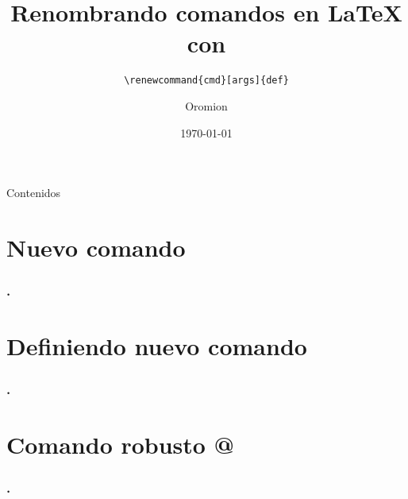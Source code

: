 \documentclass[12pt]{beamer}
\begin{document}
	\author{Oromion}
	\title{Renombrando comandos en \LaTeX{} con}
	\cprotect\subtitle{\verb|\renewcommand{cmd}[args]{def}|}
	\logo{\LaTeX{}}
	\date{\today}
	\subject{Fin del curso}
	\begin{frame}[plain]
	\maketitle
\end{frame}


\begin{frame}{Contenidos}{}
\tableofcontents
\end{frame}
\section{Nuevo comando}
\begin{frame}
\frametitle{\thesection.}

\end{frame}
\section{Definiendo nuevo comando}


\begin{frame}
\frametitle{\thesection.}
\end{frame}
\section{Comando robusto @}

\begin{frame}
\frametitle{\thesection.}

\end{frame}
\end{document}
